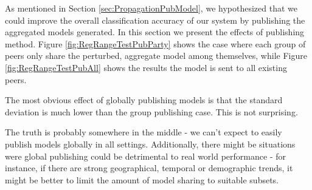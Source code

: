 As mentioned in Section \ref{sec:PropagationPubModel}, we hypothesized that we could improve the overall classification accuracy of our system by publishing the aggregated models generated. In this section we present the effects of publishing method. Figure \ref{fig:RegRangeTestPubParty} shows the case where each group of peers only share the perturbed, aggregate model among themselves, while Figure \ref{fig:RegRangeTestPubAll} shows the results the model is sent to all existing peers. 

The most obvious effect of globally publishing models is that the standard deviation is much lower than the group publishing case. This is not surprising.

The truth is probably somewhere in the middle - we can't expect to easily publish models globally in all settings. Additionally, there might be situations were global publishing could be detrimental to real world performance - for instance, if there are strong geographical, temporal or demographic trends, it might be better to limit the amount of model sharing to suitable subsets.

